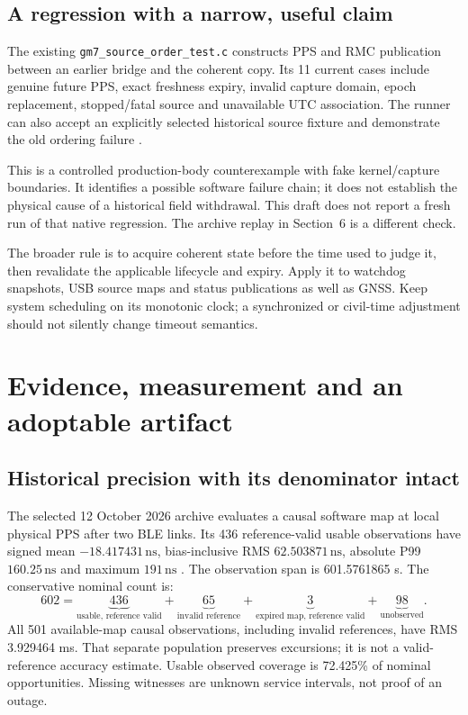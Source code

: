 \documentclass[10pt,letterpaper]{article}
\newcommand{\src}[1]{\nolinkurl{#1}}
\newcommand{\ns}{\,\mathrm{ns}}
\begin{document}
\subsection{A regression with a narrow, useful claim}
The existing \src{gm7_source_order_test.c} constructs PPS and RMC publication between an earlier bridge and the coherent copy. Its 11 current cases include genuine future PPS, exact freshness expiry, invalid capture domain, epoch replacement, stopped/fatal source and unavailable UTC association. The runner can also accept an explicitly selected historical source fixture and demonstrate the old ordering failure \cite{implementation}.

This is a controlled production-body counterexample with fake kernel/capture boundaries. It identifies a possible software failure chain; it does not establish the physical cause of a historical field withdrawal. This draft does not report a fresh run of that native regression. The archive replay in Section~6 is a different check.

The broader rule is to acquire coherent state before the time used to judge it, then revalidate the applicable lifecycle and expiry. Apply it to watchdog snapshots, USB source maps and status publications as well as GNSS. Keep system scheduling on its monotonic clock; a synchronized or civil-time adjustment should not silently change timeout semantics.

\newpage
\section{Evidence, measurement and an adoptable artifact}
\subsection{Historical precision with its denominator intact}
The selected 12 October 2026 archive evaluates a causal software map at local physical PPS after two BLE links. Its 436 reference-valid usable observations have signed mean $-18.417431\ns$, bias-inclusive RMS $62.503871\ns$, absolute P99 $160.25\ns$ and maximum $191\ns$ \cite{archive}. The observation span is 601.5761865 s. The conservative nominal count is:
\[
602=\underbrace{436}_{\text{usable, reference valid}}+
\underbrace{65}_{\text{invalid reference}}+
\underbrace{3}_{\text{expired map, reference valid}}+
\underbrace{98}_{\text{unobserved}} .
\]
All 501 available-map causal observations, including invalid references, have RMS 3.929464 ms. That separate population preserves excursions; it is not a valid-reference accuracy estimate. Usable observed coverage is 72.425\% of nominal opportunities. Missing witnesses are unknown service intervals, not proof of an outage.
\end{document}
